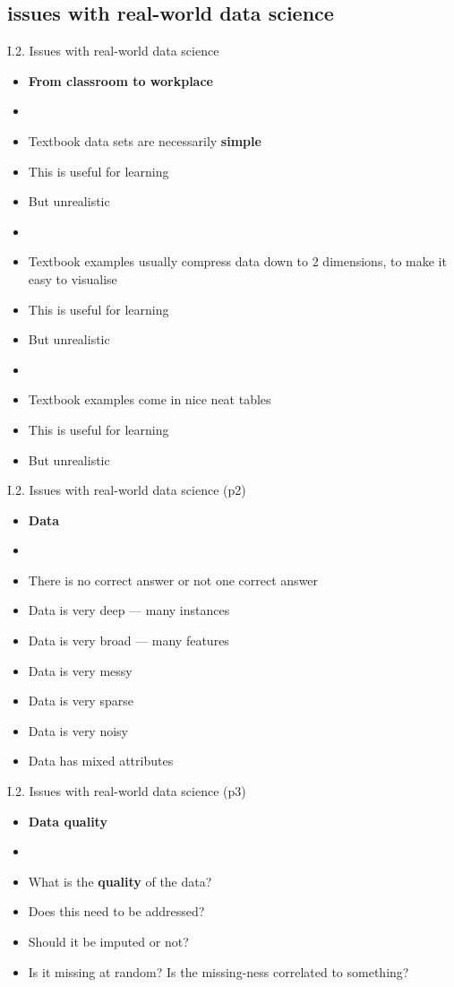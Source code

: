 \documentclass[handout]{beamer}
\newcommand{\strong}[1]{\textbf{\color{teal} #1}}
\begin{document}
\subsection{issues with real-world data science}
\begin{frame}{I.2. Issues with real-world data science}
\begin{itemize}
\item[] \strong{From classroom to workplace}
\item[]
\item Textbook data sets are necessarily \strong{simple}
\item This is useful for learning
\item But unrealistic
\item[]
\item Textbook examples usually compress data down to 2 dimensions, to make it easy to visualise
\item This is useful for learning
\item But unrealistic
\item[]
\item Textbook examples come in nice neat tables
\item This is useful for learning
\item But unrealistic
\end{itemize}
\end{frame}
\begin{frame}{I.2. Issues with real-world data science (p2)}
\begin{itemize}
\item[] \strong{Data}
\item[]
\item There is no correct answer or not one correct answer
\item Data is very deep --- many instances
\item Data is very broad --- many features
\item Data is very messy
\item Data is very sparse
\item Data is very noisy
\item Data has mixed attributes
\end{itemize}
\end{frame}
\begin{frame}{I.2. Issues with real-world data science (p3)}
\begin{itemize}
\item[] \strong{Data quality}
\item[]
\item What is the \strong{quality} of the data?
\item Does this need to be addressed?
\item Should it be imputed or not?
\item Is it missing at random? Is the missing-ness correlated to something? 
\end{itemize}
\end{frame}
\end{document}
